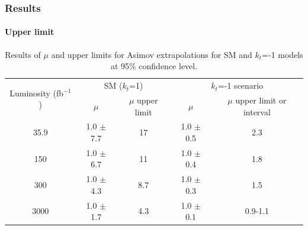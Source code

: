 \documentclass[11pt]{beamer}
\begin{document}
 \begin{frame}
 \frametitle{Results}
 \framesubtitle{Upper limit}
 \begin{table}[ht]
 {  \tiny
 		\caption[Results of $\mu$ and upper limits for SM and $k_t$=-1]{Results of $\mu$ and upper limits for Asimov extrapolations for SM  and $k_t$=-1 models at 95$\%$ confidence level.}
 		\begin{tabular}{|c|c|c|c|c|}
 			\hline
 			\multirow{2}{*}{Luminosity (fb$^{-1}$)}  &\multicolumn{2}{c|}{SM ($k_t$=1)} &\multicolumn{2}{c|}{$k_t$=-1 scenario}\\
 			\hhline{~----}                        &$\mu$  &$\mu$ upper limit & $\mu$ &$\mu$ upper limit or interval\\
 			\hline
 			35.9 & 1.0 $\pm$ 7.7 & 17 & 1.0 $\pm$ 0.5 & 2.3 \\
 			\hline
 			150& 1.0 $\pm$ 6.7& 11 & 1.0 $\pm$ 0.4 &1.8\\
 			\hline
 			300&1.0 $\pm$ 4.3 &8.7 & 1.0 $\pm$ 0.3 &1.5 \\
 			\hline
 			3000&1.0 $\pm$ 1.7 & 4.3 & 1.0 $\pm$ 0.1 & 0.9-1.1\\
 			\hline
 		\end{tabular}
 		\label{upper}
                }
 	\end{table}
 \end{frame}


\end{document}
